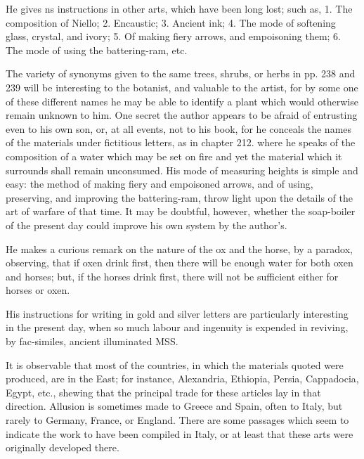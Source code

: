 \documentclass[a4paper, 11pt, oneside, polutonikogreek, italian]{article}
\begin{document}
He gives ns instructions in other arts, which have been long lost; such as, 1. The composition of Niello; 2. Encaustic; 3. Ancient ink; 4. The mode of softening glass, crystal, and ivory; 5. Of making fiery arrows, and empoisoning them; 6. The mode of using the battering-ram, etc.

The variety of synonyms given to the same trees, shrubs, or herbs in pp. 238 and 239 will be interesting to the botanist, and valuable to the artist, for by some one of these different names he may be able to identify a plant which would otherwise remain unknown to him. One secret the author appears to be afraid of entrusting even to his own son, or, at all events, not to his book, for he conceals the names of the materials under fictitious letters, as in chapter 212. where he speaks of the composition of a water which may be set on fire and yet the material which it surrounds shall remain unconsumed. His mode of measuring heights is simple and easy: the method of making fiery and empoisoned arrows, and of using, preserving, and improving the battering-ram, throw light upon the details of the art of warfare of that time. It may be doubtful, however, whether the soap-boiler of the present day could improve his own system by the author's.

He makes a curious remark on the nature of the ox and the horse, by a paradox, observing, that if oxen drink first, then there will be enough water for both oxen and horses; but, if the horses drink first, there will not be sufficient either for horses or oxen.

His instructions for writing in gold and silver letters are particularly interesting in the present day, when so much labour and ingenuity is expended in reviving, by fac-similes, ancient illuminated MSS.

It is observable that most of the countries, in which the materials quoted were produced, are in the East; for instance, Alexandria, Ethiopia, Persia, Cappadocia, Egypt, etc., shewing that the principal trade for these articles lay in that direction. Allusion is sometimes made to Greece and Spain, often to Italy, but rarely to Germany, France, or England. There are some passages which seem to indicate the work to have been compiled in Italy, or at least that these arts were originally developed there.
\end{document}
